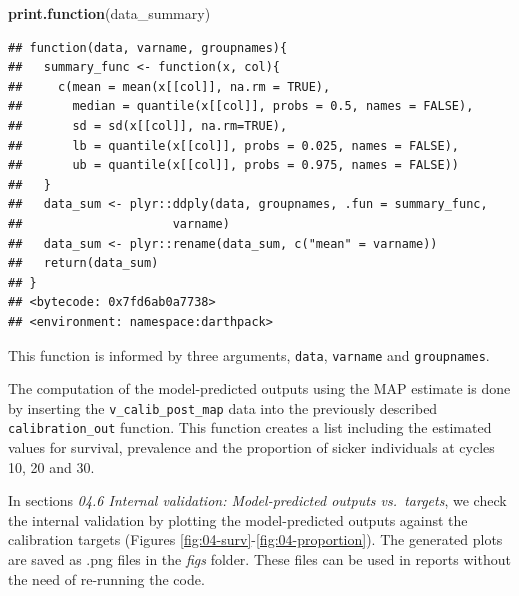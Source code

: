 \documentclass[]{book}
\newenvironment{Shaded}{\begin{snugshade}}{\end{snugshade}}
\newcommand{\KeywordTok}[1]{\textcolor[rgb]{0.13,0.29,0.53}{\textbf{#1}}}
\newcommand{\NormalTok}[1]{#1}
\begin{document}
\begin{Shaded}
\begin{Highlighting}[]
\KeywordTok{print.function}\NormalTok{(data_summary)}
\end{Highlighting}
\end{Shaded}

\begin{verbatim}
## function(data, varname, groupnames){
##   summary_func <- function(x, col){
##     c(mean = mean(x[[col]], na.rm = TRUE),
##       median = quantile(x[[col]], probs = 0.5, names = FALSE),
##       sd = sd(x[[col]], na.rm=TRUE),
##       lb = quantile(x[[col]], probs = 0.025, names = FALSE),
##       ub = quantile(x[[col]], probs = 0.975, names = FALSE))
##   }
##   data_sum <- plyr::ddply(data, groupnames, .fun = summary_func, 
##                     varname)
##   data_sum <- plyr::rename(data_sum, c("mean" = varname))
##   return(data_sum)
## }
## <bytecode: 0x7fd6ab0a7738>
## <environment: namespace:darthpack>
\end{verbatim}

This function is informed by three arguments, \texttt{data},
\texttt{varname} and \texttt{groupnames}.

The computation of the model-predicted outputs using the MAP estimate is
done by inserting the \texttt{v\_calib\_post\_map} data into the
previously described \texttt{calibration\_out} function. This function
creates a list including the estimated values for survival, prevalence
and the proportion of sicker individuals at cycles 10, 20 and 30.

In sections \emph{04.6 Internal validation: Model-predicted outputs
vs.~targets}, we check the internal validation by plotting the
model-predicted outputs against the calibration targets (Figures
\ref{fig:04-surv}-\ref{fig:04-proportion}). The generated plots are
saved as .png files in the \emph{figs} folder. These files can be used
in reports without the need of re-running the code.
\end{document}

